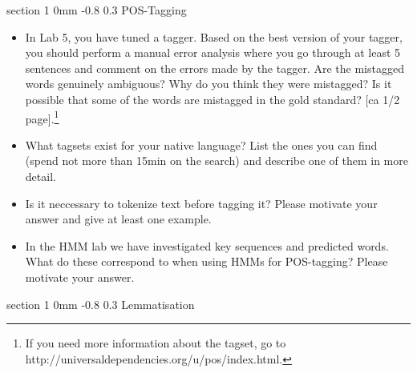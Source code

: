 \documentclass[11pt]{article}
\makeatletter
\newcommand{\newsec}[1]{\section{#1}\noindent}
\renewcommand{\section}{\@startsection
{section}%
{1}%
{0mm}%
{-0.8\baselineskip}%
{0.3\baselineskip}%
{\bfseries\large}}%
\makeatother
\begin{document}
\newsec{POS-Tagging}%
\begin{itemize}
\item In Lab 5, you have tuned a tagger. Based on the best version of
  your tagger, you should perform a manual error analysis where you go
  through at least 5 sentences and comment on the errors made by the
  tagger. Are the mistagged words genuinely ambiguous? Why do you
  think they were mistagged? Is it possible that some of the words are
  mistagged in the gold standard? \textcolor{UUred}{[ca 1/2 page]}.\footnote{If you need more information about the tagset, go to http://universaldependencies.org/u/pos/index.html.}
\item What tagsets exist for your native language? List the ones you
  can find (spend not more than 15min on the search) and describe one
  of them in more detail.
\item Is it neccessary to tokenize text before tagging it? Please
  motivate your answer and give at least one
  example.%
\item In the HMM lab we have investigated key sequences and predicted words. 
What do these correspond to when using HMMs for POS-tagging? Please motivate your answer. %
\end{itemize}


\newsec{Lemmatisation}%
\end{document}
